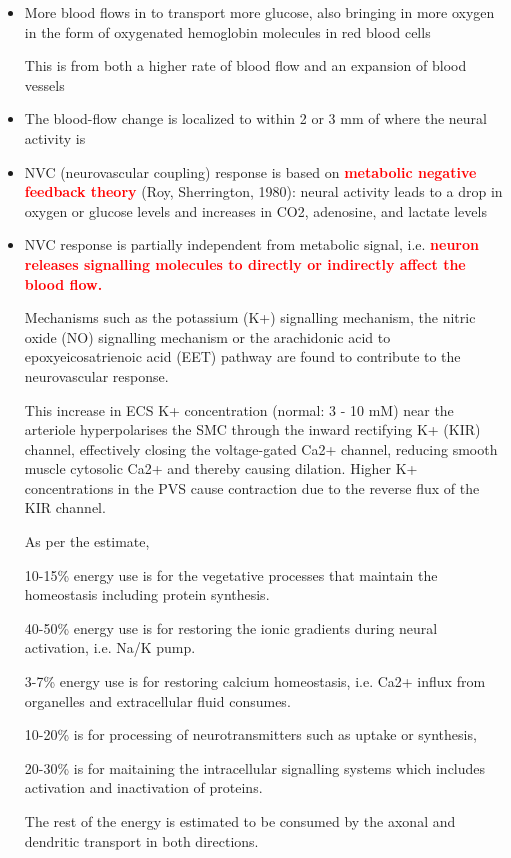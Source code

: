 \begin{itemize}
  \item   More blood flows in to transport more glucose, also bringing in more
  oxygen in the form of oxygenated hemoglobin molecules in red blood cells 

This is from both a higher rate of blood flow and an expansion of blood vessels
  
  \item The blood-flow change is localized to within 2 or 3 mm of where the
  neural activity is
  
  \item NVC (neurovascular coupling) response is based on \textcolor{red}{\bf
  metabolic negative feedback theory} (Roy, Sherrington, 1980): neural activity
  leads to a drop in oxygen or glucose levels and increases in CO2, adenosine,
  and lactate levels


   \item NVC response is partially independent from metabolic
   signal, i.e. \textcolor{red}{\bf neuron releases signalling molecules
   to directly or indirectly affect the blood flow.} 
   
Mechanisms such as the potassium (K+) signalling mechanism, the nitric oxide
(NO) signalling mechanism or the arachidonic acid to epoxyeicosatrienoic acid
(EET) pathway are found to contribute to the neurovascular response.

This increase in ECS K+ concentration (normal: 3 - 10 mM) near the arteriole
hyperpolarises the SMC through the inward rectifying K+ (KIR) channel,
effectively closing the voltage-gated Ca2+ channel, reducing smooth muscle
cytosolic Ca2+ and thereby causing dilation. Higher K+ concentrations in the PVS
cause contraction due to the reverse flux of the KIR channel.

As per the estimate, 

10-15\% energy use is for the vegetative processes that maintain the homeostasis
including protein synthesis.

40-50\% energy use is for restoring the ionic gradients during neural
activation, i.e. Na/K pump.	

3-7\% energy use is for restoring calcium homeostasis, i.e. Ca2+ influx from
organelles and extracellular fluid consumes.


10-20\% is for processing of neurotransmitters such as uptake
or synthesis, 

20-30\% is for maitaining the intracellular signalling systems which includes
activation and inactivation of proteins.

The rest of the energy is estimated to be consumed by the
axonal and dendritic transport in both directions.

\end{itemize}

